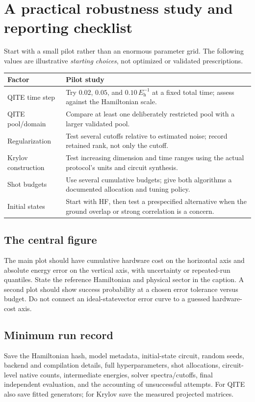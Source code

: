 \documentclass[11pt,a4paper]{article}
\newcommand{\Eh}{E_{\mathrm h}}
\newcommand{\lesson}[2]{\clearpage\section{#1}\label{#2}}
\begin{document}
\lesson{A practical robustness study and reporting checklist}{sec:robustness}
Start with a small pilot rather than an enormous parameter grid. The following values are illustrative \emph{starting choices}, not optimized or validated prescriptions.

\begin{tabularx}{\linewidth}{@{}p{3.1cm}X@{}}
\toprule
Factor & Pilot study\\\midrule
QITE time step & Try $0.02$, $0.05$, and $0.10\,\Eh^{-1}$ at a fixed total time; assess against the Hamiltonian scale.\\
QITE pool/domain & Compare at least one deliberately restricted pool with a larger validated pool.\\
Regularization & Test several cutoffs relative to estimated noise; record retained rank, not only the cutoff.\\
Krylov construction & Test increasing dimension and time ranges using the actual protocol's units and circuit synthesis.\\
Shot budgets & Use several cumulative budgets; give both algorithms a documented allocation and tuning policy.\\
Initial states & Start with HF, then test a prespecified alternative when the ground overlap or strong correlation is a concern.\\\bottomrule
\end{tabularx}

\subsection*{The central figure}
The main plot should have cumulative hardware cost on the horizontal axis and absolute energy error on the vertical axis, with uncertainty or repeated-run quantiles. State the reference Hamiltonian and physical sector in the caption. A second plot should show success probability at a chosen error tolerance versus budget. Do not connect an ideal-statevector error curve to a guessed hardware-cost axis.

\subsection*{Minimum run record}
Save the Hamiltonian hash, model metadata, initial-state circuit, random seeds, backend and compilation details, full hyperparameters, shot allocations, circuit-level native counts, intermediate energies, solver spectra/cutoffs, final independent evaluation, and the accounting of unsuccessful attempts. For QITE also save fitted generators; for Krylov save the measured projected matrices.
\end{document}
